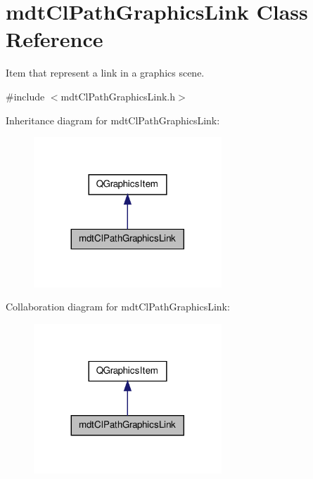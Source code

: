 \hypertarget{classmdt_cl_path_graphics_link}{\section{mdt\-Cl\-Path\-Graphics\-Link Class Reference}
\label{classmdt_cl_path_graphics_link}
}


Item that represent a link in a graphics scene.  




{\ttfamily \#include $<$mdt\-Cl\-Path\-Graphics\-Link.\-h$>$}



Inheritance diagram for mdt\-Cl\-Path\-Graphics\-Link\-:
\nopagebreak
\begin{figure}[H]
\begin{center}
\leavevmode
\includegraphics[width=200pt]{classmdt_cl_path_graphics_link__inherit__graph}
\end{center}
\end{figure}


Collaboration diagram for mdt\-Cl\-Path\-Graphics\-Link\-:
\nopagebreak
\begin{figure}[H]
\begin{center}
\leavevmode
\includegraphics[width=200pt]{classmdt_cl_path_graphics_link__coll__graph}
\end{center}
\end{figure}
